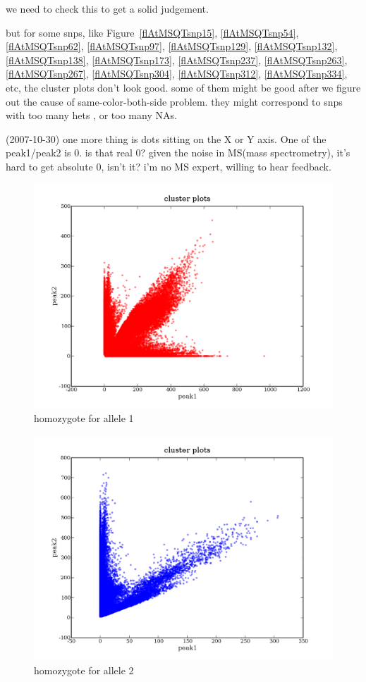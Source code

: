 \documentclass[a4paper,10pt]{article}
\begin{document}
we need to check this to get a solid judgement.

but for some snps, like Figure~\ref{flAtMSQTsnp15}, \ref{flAtMSQTsnp54}, \ref{flAtMSQTsnp62}, \ref{flAtMSQTsnp97}, \ref{flAtMSQTsnp129}, \ref{flAtMSQTsnp132}, \ref{flAtMSQTsnp138}, \ref{flAtMSQTsnp173}, \ref{flAtMSQTsnp237}, \ref{flAtMSQTsnp263}, \ref{flAtMSQTsnp267}, \ref{flAtMSQTsnp304}, \ref{flAtMSQTsnp312}, \ref{flAtMSQTsnp334}, etc, the cluster plots don't look good. some of them might be good after we figure out the cause of same-color-both-side problem. they might correspond to snps with too many hets , or too many NAs.

(2007-10-30) one more thing is dots sitting on the X or Y axis. One of the peak1/peak2 is 0. is that real 0? given the noise in MS(mass spectrometry), it's hard to get absolute 0, isn't it? i'm no MS expert, willing to hear feedback.


\begin{figure}
\includegraphics[width=1\textwidth]{figures/cluster_plots_allele1.png}
\caption{homozygote for allele 1}\label{f1}
\end{figure}

\begin{figure}
\includegraphics[width=1\textwidth]{figures/cluster_plots_allele2.png}
\caption{homozygote for allele 2}\label{f2}
\end{figure}
\end{document}
